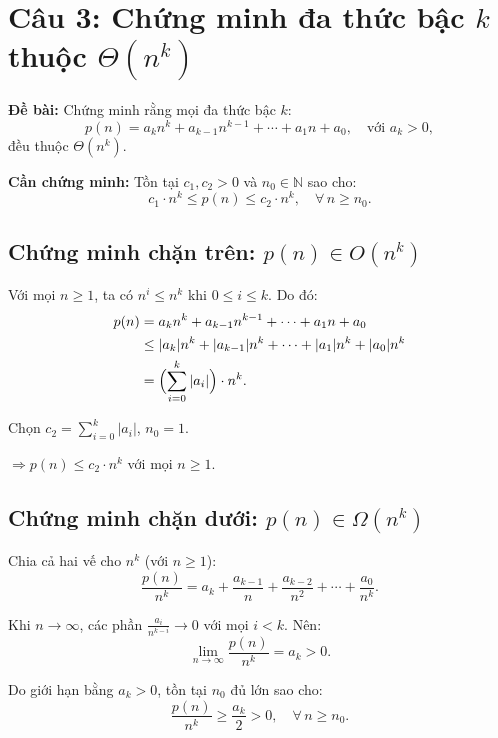 \documentclass[12pt,a4paper]{article}
\begin{document}
\newpage
\section{Câu 3: Chứng minh đa thức bậc $k$ thuộc $\Theta(n^k)$}

\textbf{Đề bài:} Chứng minh rằng mọi đa thức bậc $k$:
\[
  p(n) = a_k n^k + a_{k-1} n^{k-1} + \cdots + a_1 n + a_0, \quad \text{với } a_k > 0,
\]
đều thuộc $\Theta(n^k)$.

\bigskip

\textbf{Cần chứng minh:} Tồn tại $c_1, c_2 > 0$ và $n_0 \in \mathbb{N}$ sao cho:
\[
  c_1 \cdot n^k \leq p(n) \leq c_2 \cdot n^k, \quad \forall\, n \geq n_0.
\]

\subsection*{Chứng minh chặn trên: $p(n) \in O(n^k)$}

Với mọi $n \geq 1$, ta có $n^i \leq n^k$ khi $0 \leq i \leq k$. Do đó:
\begin{align*}
  p(n) &= a_k n^k + a_{k-1}n^{k-1} + \cdots + a_1 n + a_0 \\
       &\leq |a_k| n^k + |a_{k-1}| n^k + \cdots + |a_1| n^k + |a_0| n^k \\
       &= \Bigl(\sum_{i=0}^{k} |a_i|\Bigr) \cdot n^k.
\end{align*}

Chọn $c_2 = \displaystyle\sum_{i=0}^{k} |a_i|$, $n_0 = 1$.

$\Longrightarrow p(n) \leq c_2 \cdot n^k$ với mọi $n \geq 1$. \checkmark

\subsection*{Chứng minh chặn dưới: $p(n) \in \Omega(n^k)$}

Chia cả hai vế cho $n^k$ (với $n \geq 1$):
\[
  \frac{p(n)}{n^k} = a_k + \frac{a_{k-1}}{n} + \frac{a_{k-2}}{n^2} + \cdots + \frac{a_0}{n^k}.
\]

Khi $n \to \infty$, các phần $\frac{a_i}{n^{k-i}} \to 0$ với mọi $i < k$. Nên:
\[
  \lim_{n\to\infty} \frac{p(n)}{n^k} = a_k > 0.
\]

Do giới hạn bằng $a_k > 0$, tồn tại $n_0$ đủ lớn sao cho:
\[
  \frac{p(n)}{n^k} \geq \frac{a_k}{2} > 0, \quad \forall\, n \geq n_0.
\]
\end{document}
